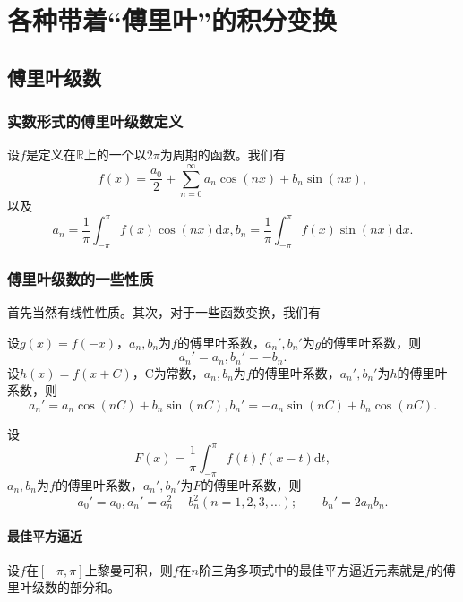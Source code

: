 \hypertarget{sec:fourier}{%
\section{各种带着``傅里叶''的积分变换}\label{sec:fourier}}

\hypertarget{sec:fourier-series}{%
\subsection{傅里叶级数}\label{sec:fourier-series}}

\hypertarget{sec:fourier-series-real}{%
\subsubsection{实数形式的傅里叶级数定义}\label{sec:fourier-series-real}}

设$f$是定义在$\mathbb{R}$上的一个以$2\pi$为周期的函数。我们有
\[
f(x) = \frac{a_0}{2} + \sum_{n=0}^{\infty} a_n \cos (nx) + b_n \sin(nx), 
\] 
以及
\[
a_n = \frac{1}{\pi} \int_{-\pi}^{\pi} f(x) \cos (nx) \mathrm{d}x, b_n =  \frac{1}{\pi} \int_{-\pi}^{\pi} f(x) \sin (nx) \mathrm{d}x.
\]

\hypertarget{sec:fourier-series-attributes}{%
\subsubsection{傅里叶级数的一些性质}\label{sec:fourier-series-attributes}}

首先当然有线性性质。其次，对于一些函数变换，我们有

设$g(x) = f(-x)$，$a_n, b_n$为$f$的傅里叶系数，$a_n', b_n'$为$g$的傅里叶系数，则
\[
a_n' = a_n, b_n' = -b_n.
\]
设$h(x) = f(x+C)$，C为常数，$a_n, b_n$为$f$的傅里叶系数，$a_n', b_n'$为$h$的傅里叶系数，则
\[
a_n' = a_n \cos (nC) + b_n \sin (nC), b_n' = -a_n \sin (nC) + b_n \cos (nC).
\]

设
\[
F(x) = \frac{1}{\pi} \int_{-\pi}^{\pi} f(t) f(x-t) \mathrm{d}t,
\]
$a_n, b_n$为$f$的傅里叶系数，$a_n', b_n'$为$F$的傅里叶系数，则
\[
a_0' = a_0, a_n' = a_n^2 - b_n^2 (n = 1, 2, 3, \ldots); \qquad b_n' = 2a_n b_n.
\]

\hypertarget{ux6700ux4f73ux5e73ux65b9ux903cux8fd1}{%
\paragraph{最佳平方逼近}\label{ux6700ux4f73ux5e73ux65b9ux903cux8fd1}}

设$f$在$[-\pi, \pi]$上黎曼可积，则$f$在$n$阶三角多项式中的最佳平方逼近元素就是$f$的傅里叶级数的部分和。

